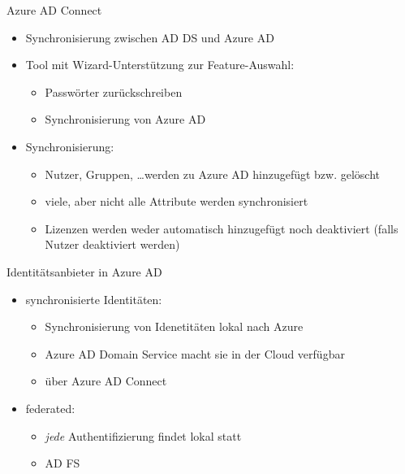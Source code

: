 \begin{flashcard}[Definition]{Azure AD Connect}
  \begin{itemize}
    \item Synchronisierung zwischen AD DS und Azure AD
    \item Tool mit Wizard-Unterstützung zur Feature-Auswahl:
    \begin{itemize}
      \item Passwörter zurückschreiben
      \item Synchronisierung von Azure AD
    \end{itemize}
    \item Synchronisierung:
    \begin{itemize}
      \item Nutzer, Gruppen, \ldots werden zu Azure AD hinzugefügt bzw. gelöscht
      \item viele, aber nicht alle Attribute werden synchronisiert
      \item Lizenzen werden weder automatisch hinzugefügt noch deaktiviert (falls Nutzer deaktiviert werden)
    \end{itemize}
  \end{itemize}
\end{flashcard}

\begin{flashcard}[Definition]{Identitätsanbieter in Azure AD}
  \begin{itemize}
    \item synchronisierte Identitäten:\newline
      \begin{itemize}
        \item Synchronisierung von Idenetitäten lokal nach Azure
        \item Azure AD Domain Service macht sie in der Cloud verfügbar
        \item über Azure AD Connect
      \end{itemize}
    \item federated:
      \begin{itemize}
        \item \emph{jede} Authentifizierung findet lokal statt
        \item AD FS
      \end{itemize}
  \end{itemize}
\end{flashcard}

